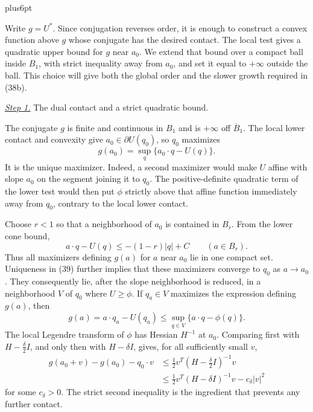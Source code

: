 \documentclass[11pt,reqno]{amsart}
\makeatletter
\theoremstyle{plain}
\theoremstyle{definition}
\theoremstyle{remark}
\renewenvironment{proof}[1][\proofname]{%
  \par
  \pushQED{\qed}%
  \normalfont
  \topsep6pt plus6pt\relax
  \trivlist
  \item[\hskip\labelsep\slshape #1\@addpunct{.}]%
  \ignorespaces
}{%
  \popQED
  \endtrivlist
  \@endpefalse
}
\DeclareRobustCommand{\qed}{%
  \leavevmode\unskip\penalty9999\hbox{}\nobreak
  \ifmmode
    \makebox[0pt][l]{\qquad\hbox{\qedsymbol}}%
  \else
    \qquad\hbox{\qedsymbol}%
  \fi
}
\renewcommand{\qedsymbol}{\rule[.47pt]{4pt}{6pt}}
\numberwithin{equation}{section}
\newcommand{\1}{\mathbf 1}
\makeatother
\begin{document}
\begin{proof}
Write $g=U^*$.  Since conjugation reverses order, it is enough to
construct a convex function above $g$ whose conjugate has the desired
contact.  The local test gives a quadratic upper bound for $g$ near
$a_0$.  We extend that bound over a compact ball inside $B_1$, with
strict inequality away from $a_0$, and set it equal to $+\infty$
outside the ball.  This choice will give both the global order and
the slower growth required in (38b).

\smallskip\noindent
\underline{\textit{Step 1.}} The dual contact and a strict quadratic bound.

The conjugate $g$ is finite and continuous in $B_ 1$ and is
$+\infty$ off $\overline B_ 1$.  The local lower contact and
convexity give $a_ 0\in\partial U(q_ 0)$, so $q_ 0$ maximizes
\begin{equation}
g(a_ 0)=\sup_ q\{a_ 0\cdot q-U(q)\}.
\tag{39}
\end{equation}
It is the unique maximizer.  Indeed, a second maximizer would make
$U$ affine with slope $a_ 0$ on the segment joining it to $q_ 0$.
The positive-definite quadratic term of the lower test would then put
$\phi$ strictly above that affine function immediately away from
$q_ 0$, contrary to the local lower contact.

Choose $r<1$ so that a neighborhood of $a_ 0$ is contained in
$B_ r$.  From the lower cone bound,
\begin{equation}
a\cdot q-U(q)\leq-(1-r)|q|+C\qquad(a\in B_ r).
\tag{40}
\end{equation}
Thus all maximizers defining $g(a)$ for $a$ near $a_ 0$ lie in
one compact set.  Uniqueness in (39) further implies that these
maximizers converge to $q_ 0$ as $a\to a_ 0$.  They consequently
lie, after the slope neighborhood is reduced, in a neighborhood
$V$ of $q_0$ where $U\geq\phi$.  If $q_a\in V$ maximizes the
expression defining $g(a)$, then
\begin{equation*}
g(a)=a\cdot q_a-U(q_a)
\leq\sup_{q\in V}\{a\cdot q-\phi(q)\}.
\end{equation*}
The local Legendre transform of $\phi$ has
Hessian $H^{-1}$ at $a_ 0$.  Comparing first with
$H-\frac\delta2I$, and only then with $H-\delta I$, gives, for
all sufficiently small $v$,
\begin{equation}
\begin{split}
g(a_ 0+v)-g(a_ 0)-q_ 0\cdot v
&\leq\frac12v^T(H-\tfrac\delta2I)^{-1}v\\
&\leq\frac12v^T(H-\delta I)^{-1}v-c_ \delta|v|^2
\end{split}
\tag{41}
\end{equation}
for some $c_ \delta>0$.  The strict second inequality is the
ingredient that prevents any further contact.


\end{proof}
\end{document}
